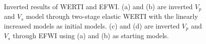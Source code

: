 \begin{figure}[!htb]
   \centering
   \\
   \caption{Inverted results of WERTI and EFWI. (a) and (b) are inverted $V_p$ and
       $V_s$ model through two-stage elastic WERTI with the linearly increased models
       as initial models. (c) and (d) are inverted $V_p$ and $V_s$ through EFWI using
   (a) and (b) as starting models.}
   \label{fig:InvertedModel}
\end{figure}
